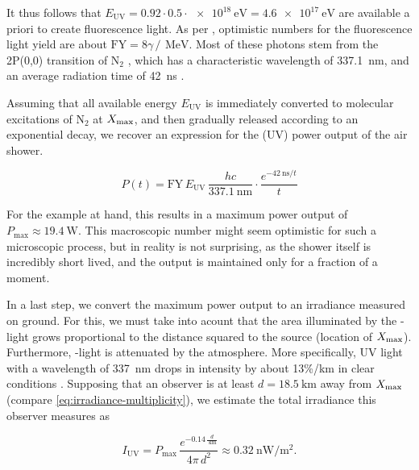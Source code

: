 It thus follows that $E_\text{UV}=0.92\cdot0.5\cdot\SI{e18}{\electronvolt}=
\SI{4.6e17}{\electronvolt}$ are available a priori to create fluorescence light.
As per \cite{Keilhauer2013}, optimistic numbers for the fluorescence light yield
are about $\text{FY}=8\gamma\,/\,\SI{}{\mega\electronvolt}$. Most of these 
photons stem from the 2P(0,0) transition of N$_2$ \cite{Ave2008}, which has a 
characteristic wavelength of \SI{337.1}{\nano\meter}, and an average radiation 
time of \SI{42}{\nano\second} \cite{Lean1989}. 

Assuming that all available energy $E_\text{UV}$ is immediately converted to 
molecular excitations of N$_2$ at $X_\mathrm{max}$, and then gradually released according
to an exponential decay, we recover an expression for the (UV) power output of 
the air shower.

\begin{equation}
\label{eq:irradiance-power}
P(t)= \text{FY}\,E_\text{UV}\,\frac{hc}{\SI{337.1}{\nano\meter}} \cdot\frac{e^{-\SI{42}{\nano\second}/t}}{t}   
\end{equation}

For the example at hand, this results in a maximum power output of 
$P_\text{max}\approx\SI{19.4}{\watt}$. This macroscopic number might seem
optimistic for such a microscopic process, but in reality is not surprising, as 
the shower itself is incredibly short lived, and the output is maintained only 
for a fraction of a moment.

In a last step, we convert the maximum power output to an irradiance measured on
ground. For this, we must take into acount that the area illuminated by the 
\UV-light grows proportional to the distance squared to the source (location of 
$X_\mathrm{max}$). Furthermore, \UV-light is attenuated by the atmosphere. More 
specifically, UV light with a wavelength of \SI{337}{\nano\meter} drops in 
intensity by about 13\%/km in clear conditions 
\cite[see Fig. 83 on page 103 of][]{Baum1950}. Supposing that an observer is at
least $d=\SI{18.5}{\kilo\meter}$ away from $X_\mathrm{max}$ (compare 
\cref{eq:irradiance-multiplicity}), we estimate the total irradiance this 
observer measures as

\begin{equation}
\label{eq:irradiance}
I_\text{UV} = P_\text{max}\,\frac{e^{-0.14\,\frac{d}{\SI{}{\kilo\meter}}}}{4\pi\,d^2}\approx\SI{0.32}{\nano\watt\per\square\meter}.
\end{equation}
